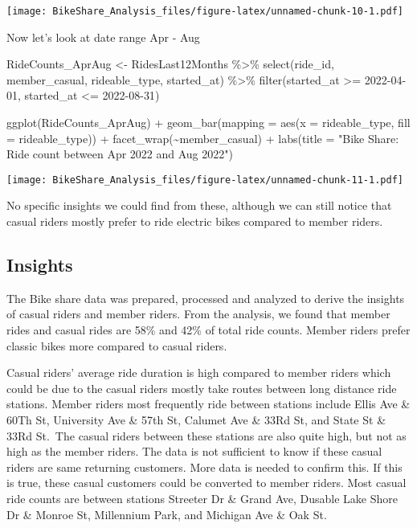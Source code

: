 \documentclass[
]{article}
\newenvironment{Shaded}{\begin{snugshade}}{\end{snugshade}}
\newcommand{\AttributeTok}[1]{\textcolor[rgb]{0.77,0.63,0.00}{#1}}
\newcommand{\FunctionTok}[1]{\textcolor[rgb]{0.00,0.00,0.00}{#1}}
\newcommand{\NormalTok}[1]{#1}
\newcommand{\OtherTok}[1]{\textcolor[rgb]{0.56,0.35,0.01}{#1}}
\newcommand{\SpecialCharTok}[1]{\textcolor[rgb]{0.00,0.00,0.00}{#1}}
\newcommand{\StringTok}[1]{\textcolor[rgb]{0.31,0.60,0.02}{#1}}
\begin{document}
\texttt{[image: BikeShare\_Analysis\_files/figure-latex/unnamed-chunk-10-1.pdf]}

Now let's look at date range Apr - Aug

\begin{Shaded}
\begin{Highlighting}[]
\NormalTok{RideCounts\_AprAug }\OtherTok{\textless{}{-}}\NormalTok{ RidesLast12Months }\SpecialCharTok{\%\textgreater{}\%}
  \FunctionTok{select}\NormalTok{(ride\_id, member\_casual, rideable\_type, started\_at) }\SpecialCharTok{\%\textgreater{}\%}
  \FunctionTok{filter}\NormalTok{(started\_at }\SpecialCharTok{\textgreater{}=} \StringTok{\textquotesingle{}2022{-}04{-}01\textquotesingle{}}\NormalTok{, started\_at }\SpecialCharTok{\textless{}=} \StringTok{\textquotesingle{}2022{-}08{-}31\textquotesingle{}}\NormalTok{)}

\FunctionTok{ggplot}\NormalTok{(RideCounts\_AprAug) }\SpecialCharTok{+} \FunctionTok{geom\_bar}\NormalTok{(}\AttributeTok{mapping =} \FunctionTok{aes}\NormalTok{(}\AttributeTok{x =}\NormalTok{ rideable\_type, }\AttributeTok{fill =}\NormalTok{ rideable\_type)) }\SpecialCharTok{+} \FunctionTok{facet\_wrap}\NormalTok{(}\SpecialCharTok{\textasciitilde{}}\NormalTok{member\_casual) }\SpecialCharTok{+} \FunctionTok{labs}\NormalTok{(}\AttributeTok{title =} \StringTok{"Bike Share: Ride count between Apr 2022 and Aug 2022"}\NormalTok{)}
\end{Highlighting}
\end{Shaded}

\texttt{[image: BikeShare\_Analysis\_files/figure-latex/unnamed-chunk-11-1.pdf]}

No specific insights we could find from these, although we can still
notice that casual riders mostly prefer to ride electric bikes compared
to member riders.

\hypertarget{insights}{%
\subsection{Insights}\label{insights}}

The Bike share data was prepared, processed and analyzed to derive the
insights of casual riders and member riders. From the analysis, we found
that member rides and casual rides are 58\% and 42\% of total ride
counts. Member riders prefer classic bikes more compared to casual
riders.

Casual riders' average ride duration is high compared to member riders
which could be due to the casual riders mostly take routes between long
distance ride stations. Member riders most frequently ride between
stations include Ellis Ave \& 60Th St, University Ave \& 57th St,
Calumet Ave \& 33Rd St, and State St \& 33Rd St.~The casual riders
between these stations are also quite high, but not as high as the
member riders. The data is not sufficient to know if these casual riders
are same returning customers. More data is needed to confirm this. If
this is true, these casual customers could be converted to member
riders. Most casual ride counts are between stations Streeter Dr \&
Grand Ave, Dusable Lake Shore Dr \& Monroe St, Millennium Park, and
Michigan Ave \& Oak St.
\end{document}
